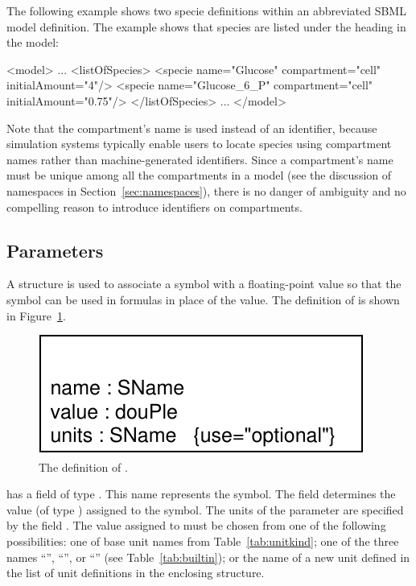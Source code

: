 \documentclass[10pt]{cekarticle}
\newcommand{\vref}[1]{\ref{#1}}
\begin{document}
The following example shows two specie definitions within an abbreviated
SBML model definition.  The example shows that species are listed under the
heading  in the model:

\begin{example}
<model>
    ...
    <listOfSpecies>
        <specie name="Glucose" compartment="cell" initialAmount="4"/>
        <specie name="Glucose_6_P" compartment="cell" initialAmount="0.75"/>
    </listOfSpecies>
    ...
</model>

\end{example}

Note that the compartment's name is used instead of an identifier, because
simulation systems typically enable users to locate species using
compartment names rather than machine-generated identifiers.  Since a
compartment's name must be unique among all the compartments in a model
(see the discussion of namespaces in Section~\ref{sec:namespaces}), there
is no danger of ambiguity and no compelling reason to introduce identifiers
on compartments.


\subsection{Parameters}
\label{sec:parameters}

A  structure is used to associate a symbol with a
floating-point value so that the symbol can be used in formulas in place of
the value.  The definition of  is shown in
Figure~\vref{fig:parameter}.

\begin{figure}[htb]
  \centering
  \includegraphics[scale = 0.68]{parameter}
  \caption{The definition of .}
  \label{fig:parameter}
\end{figure}

 has a  field of type .  This
name represents the symbol.  The field  determines the value
(of type ) assigned to the symbol.  The units of the
parameter  are specified by the field .  The
value assigned to  must be chosen from one of the following
possibilities: one of base unit names from Table~\vref{tab:unitkind}; one of
the three names ``'', ``'', or
``'' (see Table~\ref{tab:builtin}); or the name of a new
unit defined in the list of unit definitions in the enclosing 
structure.
\end{document}
